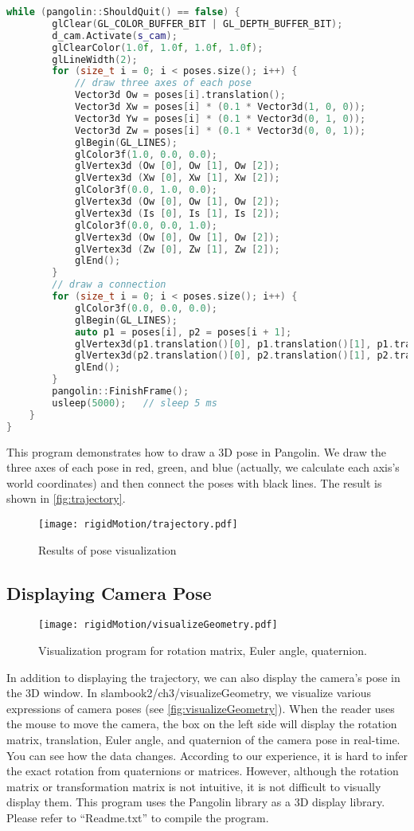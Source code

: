 \begin{lstlisting}[language=c++,caption=slambook2/ch3/examples/plotTrajectory.cpp]
	while (pangolin::ShouldQuit() == false) {
		glClear(GL_COLOR_BUFFER_BIT | GL_DEPTH_BUFFER_BIT);
		d_cam.Activate(s_cam);
		glClearColor(1.0f, 1.0f, 1.0f, 1.0f);
		glLineWidth(2);
		for (size_t i = 0; i < poses.size(); i++) {
			// draw three axes of each pose
			Vector3d Ow = poses[i].translation();
			Vector3d Xw = poses[i] * (0.1 * Vector3d(1, 0, 0));
			Vector3d Yw = poses[i] * (0.1 * Vector3d(0, 1, 0));
			Vector3d Zw = poses[i] * (0.1 * Vector3d(0, 0, 1));
			glBegin(GL_LINES);
			glColor3f(1.0, 0.0, 0.0);
			glVertex3d (Ow [0], Ow [1], Ow [2]);
			glVertex3d (Xw [0], Xw [1], Xw [2]);
			glColor3f(0.0, 1.0, 0.0);
			glVertex3d (Ow [0], Ow [1], Ow [2]);
			glVertex3d (Is [0], Is [1], Is [2]);
			glColor3f(0.0, 0.0, 1.0);
			glVertex3d (Ow [0], Ow [1], Ow [2]);
			glVertex3d (Zw [0], Zw [1], Zw [2]);
			glEnd();
		}
		// draw a connection
		for (size_t i = 0; i < poses.size(); i++) {
			glColor3f(0.0, 0.0, 0.0);
			glBegin(GL_LINES);
			auto p1 = poses[i], p2 = poses[i + 1];
			glVertex3d(p1.translation()[0], p1.translation()[1], p1.translation()[2]);
			glVertex3d(p2.translation()[0], p2.translation()[1], p2.translation()[2]);
			glEnd();
		}
		pangolin::FinishFrame();
		usleep(5000);   // sleep 5 ms
	}
}
\end{lstlisting}

This program demonstrates how to draw a 3D pose in Pangolin. We draw the three axes of each pose in red, green, and blue (actually, we calculate each axis's world coordinates) and then connect the poses with black lines. The result is shown in \autoref {fig:trajectory}.

\begin{figure}[!htp]
	\centering
	\texttt{[image: rigidMotion/trajectory.pdf]}
	\caption {Results of pose visualization}
	\label{fig:trajectory}
\end{figure}

\subsection{Displaying Camera Pose}
\begin{figure}[!htp]
	\centering
	\texttt{[image: rigidMotion/visualizeGeometry.pdf]}
	\caption {Visualization program for rotation matrix, Euler angle, quaternion. }
	\label{fig:visualizeGeometry}
\end{figure}

In addition to displaying the trajectory, we can also display the camera's pose in the 3D window. In slambook2/ch3/visualizeGeometry, we visualize various expressions of camera poses (see \autoref{fig:visualizeGeometry}). When the reader uses the mouse to move the camera, the box on the left side will display the rotation matrix, translation, Euler angle, and quaternion of the camera pose in real-time. You can see how the data changes. According to our experience, it is hard to infer the exact rotation from quaternions or matrices. However, although the rotation matrix or transformation matrix is not intuitive, it is not difficult to visually display them. This program uses the Pangolin library as a 3D display library. Please refer to ``Readme.txt'' to compile the program.

